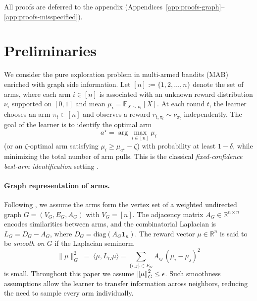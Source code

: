 \documentclass{article}
\begin{document}
All proofs are deferred to the appendix (Appendices~\ref{app:proofs-graph}--\ref{app:proofs-misspecified}).




\section{Preliminaries}\label{sec:preliminary}

We consider the pure exploration problem in multi-armed bandits (MAB) enriched with graph side information.
Let $[n] := \{1,2,\dots,n\}$ denote the set of arms, where each arm $i \in [n]$ is associated with an
unknown reward distribution $\nu_i$ supported on $[0,1]$ and mean $\mu_i = \mathbb{E}_{X \sim \nu_i}[X]$.
At each round $t$, the learner chooses an arm $\pi_t \in [n]$ and observes a reward
$r_{t,\pi_t} \sim \nu_{\pi_t}$ independently. The goal of the learner is to identify the optimal arm
\[
a^\star = \arg\max_{i \in [n]} \mu_i
\]
(or an $\zeta$-optimal arm satisfying $\mu_i \geq \mu_{a^\star} - \zeta$) with probability at least $1-\delta$,
while minimizing the total number of arm pulls. This is the classical \emph{fixed-confidence best-arm
identification} setting \citep{audibert2010best, kaufmann2016complexity}.

\paragraph{Graph representation of arms.}
Following \cite{thaker2022maximizing}, we assume the arms form the vertex set of a weighted
undirected graph $G = (V_G, E_G, A_G)$ with $V_G = [n]$.
The adjacency matrix $A_G \in \mathbb{R}^{n \times n}$ encodes similarities between arms,
and the combinatorial Laplacian is $L_G = D_G - A_G$, where
$D_G = \mathrm{diag}(A_G \mathbf{1}_n)$.
The reward vector $\mu \in \mathbb{R}^n$ is said to be \emph{smooth on $G$}
if the Laplacian seminorm
\begin{equation}
\label{eq:smoothness}
\|\mu\|_G^2 \;=\; \langle \mu, L_G \mu \rangle
= \sum_{\{i,j\}\in E_G} A_{ij} \, (\mu_i - \mu_j)^2
\end{equation}
is small. Throughout this paper we assume $\norm{\mu}_G^2 \leq \epsilon$. Such smoothness assumptions allow the learner to transfer information across neighbors,
reducing the need to sample every arm individually.
\end{document}
